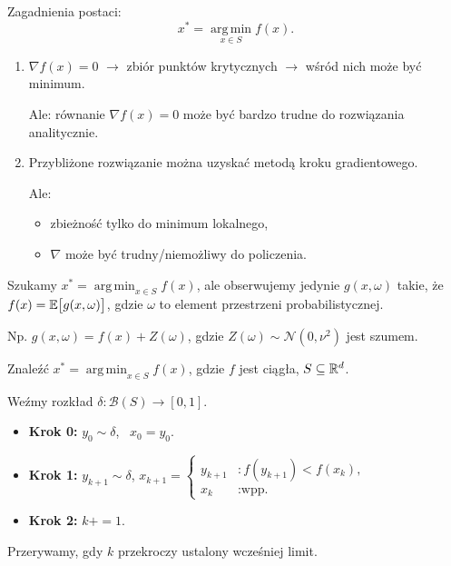 \documentclass[dvipsnames]{book}
\begin{document}
Zagadnienia postaci:
\[
  x^* = \operatorname*{arg\,min}_{x \in S} f(x).
\]

\begin{enumerate}[label=\arabic*)]
  \item $\nabla f(x) = 0$ $\longrightarrow$ zbiór punktów krytycznych
  $\longrightarrow$ wśród nich może być minimum.

  Ale: równanie $\nabla f(x) = 0$ może być bardzo trudne do rozwiązania
  analitycznie.

  \item Przybliżone rozwiązanie można uzyskać metodą kroku gradientowego.

  Ale:
  \begin{itemize}[topsep=0pt,itemsep=0pt]
    \item zbieżność tylko do minimum lokalnego,
    \item $\nabla$ może być trudny/niemożliwy do policzenia.
  \end{itemize}
\end{enumerate}

\begin{przyklad}
Szukamy $x^* = \operatorname*{arg\,min}_{x \in S} f(x)$, ale obserwujemy jedynie
$g(x, \omega)$ takie, że $f(x) = \mathbb{E}\big[g(x,\omega)\big]$, gdzie $\omega$ to
element przestrzeni probabilistycznej.

Np. $g(x,\omega) = f(x) + Z(\omega)$, gdzie $Z(\omega) \sim \mathcal{N}(0,\nu^2)$
jest szumem.
\end{przyklad}

\hrulefill

\begin{algorytm}
Znaleźć $x^* = \operatorname*{arg\,min}_{x \in S} f(x)$, gdzie $f$ jest ciągła,
$S \subseteq \mathbb{R}^d$.

Weźmy rozkład $\delta \colon \mathcal{B}(S) \to [0,1]$.

\begin{itemize}[topsep=0pt,itemsep=0pt]
  \item \textbf{Krok 0:} $y_0 \sim \delta$, \ $x_0 = y_0$.
  \item \textbf{Krok 1:} $y_{k+1} \sim \delta$, \quad
  $x_{k+1} = \begin{cases}
    y_{k+1} & : f(y_{k+1}) < f(x_k), \\
    x_k & : \text{wpp.}
  \end{cases}$
  \item \textbf{Krok 2:} $k \mathrel{{+}{=}} 1$.
\end{itemize}
Przerywamy, gdy $k$ przekroczy ustalony wcześniej limit.
\end{algorytm}
\end{document}
